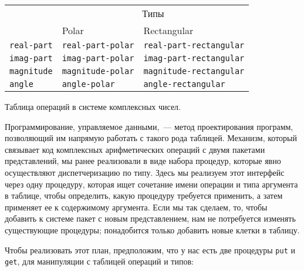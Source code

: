 \begin{cntrfig}
\begin{tabular}{|l|l|l|}
\hline
  & \multicolumn{2}{c|}{Типы} \\ \cline{2-3}
\raisebox{7pt}{Операции} & Polar & Rectangular \\ \hline
{\tt real-part} & {\tt real-part-polar} \qquad & {\tt real-part-rectangular} \\
{\tt imag-part} & {\tt imag-part-polar} & {\tt imag-part-rectangular} \\
{\tt magnitude} & {\tt magnitude-polar} & {\tt magnitude-rectangular} \\
{\tt angle}     & {\tt angle-polar}     & {\tt angle-rectangular}\\
\hline
\end{tabular}

\caption{
Таблица операций в системе комплексных чисел.}
\label{F2.22}

\end{cntrfig}

Программирование, управляемое данными,~--- метод
проектирования программ, позволяющий им напрямую работать с такого рода
таблицей.  Механизм, который связывает код
комплексных арифметических операций с двумя пакетами представлений, мы 
ранее реализовали в
виде набора процедур, которые явно осуществляют диспетчеризацию по
типу.  Здесь мы реализуем этот интерфейс через одну процедуру, которая
ищет сочетание имени операции и типа аргумента в таблице, чтобы
определить, какую процедуру требуется применить, а затем применяет ее
к содержимому аргумента.  Если мы так сделаем, то, чтобы добавить к
системе пакет с новым представлением, нам не потребуется изменять
существующие процедуры; понадобится только добавить новые клетки в
таблицу.

Чтобы реализовать этот план, предположим, что у нас есть
две процедуры {\tt put} и {\tt get}, для манипуляции с
таблицей операций и типов:

